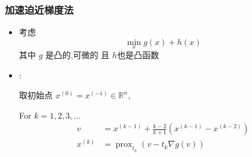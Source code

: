 \documentclass[handout]{beamer}
\begin{document}
\begin{frame}

\frametitle{加速迫近梯度法}

\begin{itemize}
	\item 
考虑
\begin{equation}
\min _{x} g(x)+h(x)
\end{equation}
其中 $g$ 是凸的,可微的 且 $h$也是凸函数

\item
{}:

取初始点 $x^{(0)}=x^{(-1)} \in \mathbb{R}^{n}$,

For $k=1,2,3, \ldots$
 \begin{equation}
\begin{aligned}
v &=x^{(k-1)}+\frac{k-2}{k+1}\left(x^{(k-1)}-x^{(k-2)}\right) \\
x^{(k)} &=\operatorname{prox}_{t_{k}}\left(v-t_{k} \nabla g(v)\right)
\end{aligned}
\end{equation}



 
\end{itemize}
\end{frame}
\end{document}
